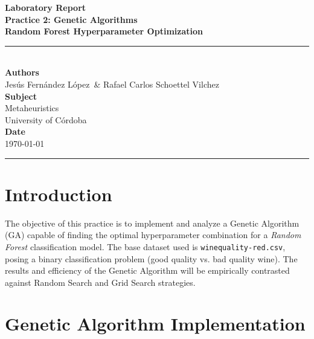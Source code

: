 \documentclass[12pt, a4paper]{article}
\newcommand{\reporttitle}{Practice 2: Genetic Algorithms\\ \vspace{0.3cm} \large Random Forest Hyperparameter Optimization}
\newcommand{\reportdate}{\today}
\newcommand{\authorA}{Jesús Fernández López}
\newcommand{\authorB}{Rafael Carlos Schoettel Vilchez}
\begin{document}

\begin{titlepage}
  \centering
  \vspace*{3cm}

  {\Huge \textbf{Laboratory Report}}\\[0.8cm]
  {\LARGE \textbf{\reporttitle}}\\[0.5cm]
  \rule{\textwidth}{0.4pt}\\[2cm]

  {\Large \textbf{Authors}}\\[0.4cm]
  {\large \authorA\ \& \authorB}\\[1.5cm]

  {\Large \textbf{Subject}}\\[0.4cm]
  {\large Metaheuristics}\\[0.4cm]
  {\normalsize University of Córdoba}\\[1.5cm]

  {\Large \textbf{Date}}\\[0.4cm]
  {\large \reportdate}

  \vfill
  \rule{\textwidth}{0.4pt}
\end{titlepage}

\newpage
\tableofcontents
\newpage

\section{Introduction}

The objective of this practice is to implement and analyze a Genetic Algorithm (GA) capable of finding the optimal hyperparameter combination for a \textit{Random Forest} classification model. The base dataset used is \texttt{winequality-red.csv}, posing a binary classification problem (good quality vs. bad quality wine). 
The results and efficiency of the Genetic Algorithm will be empirically contrasted against Random Search and Grid Search strategies.

\section{Genetic Algorithm Implementation}
\end{document}
